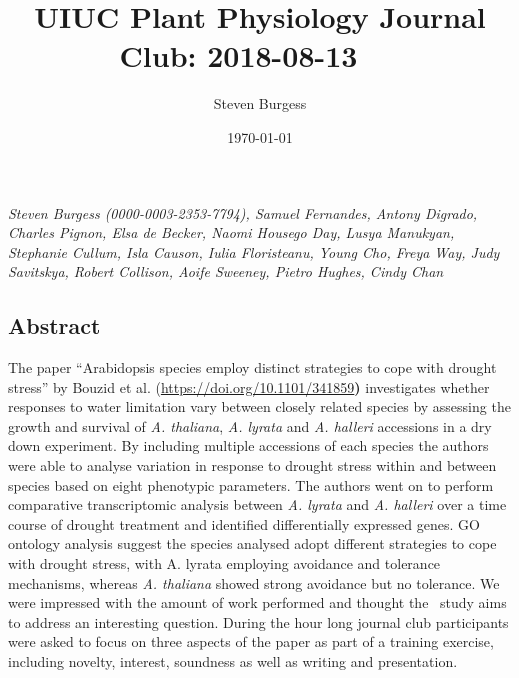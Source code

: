 \documentclass[10pt]{article}
\begin{document}
\title{UIUC Plant Physiology Journal Club: 2018-08-13~ ~}



\author[1]{Steven Burgess}%
%


\vspace{-1em}



  \date{\today}


\begingroup
\let\center\flushleft
\let\endcenter\endflushleft
\maketitle
\endgroup









\emph{Steven Burgess (0000-0003-2353-7794), Samuel Fernandes, Antony
Digrado, Charles Pignon, Elsa de Becker, Naomi Housego Day, Lusya
Manukyan, Stephanie Cullum, Isla Causon, Iulia Floristeanu, Young Cho,
Freya Way, Judy Savitskya, Robert Collison, Aoife Sweeney, Pietro
Hughes, Cindy Chan}

\subsection*{}

{\label{415290}}

\subsection*{Abstract}

{\label{415290}}

The paper ``Arabidopsis species employ distinct strategies to cope with
drought stress'' by Bouzid et al.
(\url{https://doi.org/10.1101/341859}\textbf{)} investigates whether
responses to water limitation vary between closely related species by
assessing the growth and survival of \emph{A. thaliana}, \emph{A.
lyrata} and \emph{A. halleri} accessions in a dry down experiment. By
including multiple accessions of each species the authors were able to
analyse variation in response to drought stress within and between
species based on eight phenotypic parameters. The authors went on to
perform comparative transcriptomic analysis between \emph{A. lyrata} and
\emph{A. halleri} over a time course of drought treatment and identified
differentially expressed genes. GO ontology analysis suggest the species
analysed adopt different strategies to cope with drought stress, with A.
lyrata employing avoidance and tolerance mechanisms, whereas \emph{A.
thaliana} showed strong avoidance but no tolerance. We were impressed
with the amount of work performed and thought the ~study aims to address
an interesting question. During the hour long journal club participants
were asked to focus on three aspects of the paper as part of a training
exercise, including novelty, interest, soundness as well as writing and
presentation.
\end{document}
